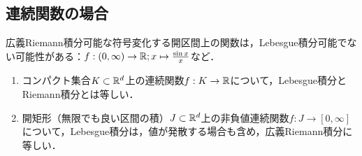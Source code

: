 \documentclass[uplatex, dvipdfmx]{jsreport}
\begin{document}
\subsection{連続関数の場合}

\begin{tcolorbox}[colframe=ForestGreen, colback=ForestGreen!10!white,breakable,colbacktitle=ForestGreen!40!white,coltitle=black,fonttitle=\bfseries\sffamily,
title=]
    広義Riemann積分可能な符号変化する開区間上の関数は，Lebesgue積分可能でない可能性がある：$f:(0,\infty)\to\mathbb{R};x\mapsto\frac{\sin x}{x}$など．
\end{tcolorbox}

\begin{theorem}[連続関数の積分]\mbox{}\label{thm-Lebesgue-integral-of-continuous-function}
    \begin{enumerate}
        \item コンパクト集合$K\subset\mathbb{R}^d$上の連続関数$f:K\to\mathbb{R}$について，Lebesgue積分とRiemann積分とは等しい．
        \item 開矩形（無限でも良い区間の積）$J\subset\mathbb{R}^d$上の非負値連続関数$f:J\to[0,\infty]$について，Lebesgue積分は，値が発散する場合も含め，広義Riemann積分に等しい．
    \end{enumerate}
\end{theorem}
\end{document}
